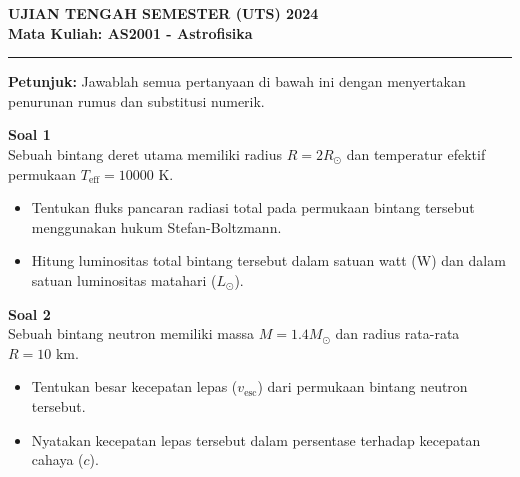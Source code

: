 \documentclass[a4paper,12pt]{article}
\begin{document}
\noindent
\textbf{UJIAN TENGAH SEMESTER (UTS) 2024} \\
\textbf{Mata Kuliah: AS2001 - Astrofisika} \\
\rule{\textwidth}{1pt}

\vspace{1em}
\noindent\textbf{Petunjuk:} Jawablah semua pertanyaan di bawah ini dengan menyertakan penurunan rumus dan substitusi numerik.

\vspace{1.5em}
\noindent\textbf{Soal 1} \\
Sebuah bintang deret utama memiliki radius $R = 2 R_\odot$ dan temperatur efektif permukaan $T_{\text{eff}} = 10000\text{ K}$.
\begin{itemize}
    \item[a.] Tentukan fluks pancaran radiasi total pada permukaan bintang tersebut menggunakan hukum Stefan-Boltzmann.
    \item[b.] Hitung luminositas total bintang tersebut dalam satuan watt (W) dan dalam satuan luminositas matahari ($L_\odot$).
\end{itemize}

\vspace{2em}
\noindent\textbf{Soal 2} \\
Sebuah bintang neutron memiliki massa $M = 1.4 M_\odot$ dan radius rata-rata $R = 10\text{ km}$.
\begin{itemize}
    \item[a.] Tentukan besar kecepatan lepas ($v_{\text{esc}}$) dari permukaan bintang neutron tersebut.
    \item[b.] Nyatakan kecepatan lepas tersebut dalam persentase terhadap kecepatan cahaya ($c$).
\end{itemize}
\end{document}
